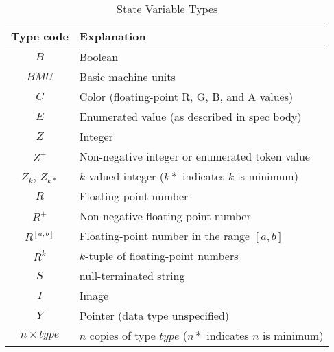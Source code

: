 \begin{table}      %
\begin{center}
\begin{tabular}{|c|p{3in}|}
\hline
Type code & Explanation \\ \hline \hline
$B$             & Boolean                                                   \\ \hline
$BMU$           & Basic machine units                                       \\ \hline
$C$             & Color (floating-point R, G, B, and A values)              \\ \hline
$E$             & Enumerated value (as described in spec body)              \\ \hline
$Z$             & Integer                                                   \\ \hline
$Z^{+}$         & Non-negative integer or enumerated token value            \\ \hline
$Z_k$, $Z_{k*}$ & $k$-valued integer ($k*$ indicates $k$ is minimum)        \\ \hline
$R$             & Floating-point number                                     \\ \hline
$R^{+}$         & Non-negative floating-point number                        \\ \hline
$R^{[a,b]}$     & Floating-point number in the range $[a,b]$                \\ \hline
$R^k$           & $k$-tuple of floating-point numbers                       \\ \hline
$S$             & null-terminated string                                    \\ \hline
$I$             & Image                                                     \\ \hline
$Y$             & Pointer (data type unspecified)                           \\ \hline
$n \times type$ & $n$ copies of type $type$ ($n*$ indicates $n$ is minimum) \\ \hline
\end{tabular}
\end{center}
\caption{State Variable Types}
\label{tab:acats}
\end{table}



